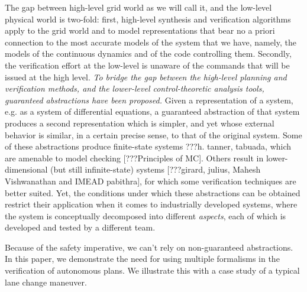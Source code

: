 {The gap between high-level grid world as we will call it, and the low-level physical world is two-fold:
first, high-level synthesis and verification algorithms apply to the grid world  and to model representations that bear no a priori connection to the most accurate models of the system that we have, namely, the models of the continuous dynamics and of the code controlling them.
Secondly, the verification effort at the low-level is unaware of the commands that will be issued at the high level. 
{\it To bridge the gap between the high-level planning and verification methods, and the lower-level control-theoretic analysis tools, guaranteed abstractions have been proposed.}
Given a representation of a system, e.g. as a system of differential equations, a guaranteed abstraction of that system produces a second representation which is simpler, and yet whose external behavior is similar, in a certain precise sense, to that of the original system.
Some of these abstractions produce finite-state systems ???h. tanner, tabuada, which are amenable to model checking [???Principles of MC]. 
Others result in lower-dimensional (but still infinite-state) systems [???girard, julius, Mahesh Vishwanathan and IMEAD pabithra], for which some verification techniques are better suited.
Yet, the conditions under which these abstractions can be obtained restrict their application when it comes to industrially developed systems, where the system is conceptually decomposed into different \emph{aspects}, each of which is developed and tested by a different team.


	
Because of the safety imperative, we can't rely on non-guaranteed abstractions.  
	In this paper, we demonstrate the need for using multiple formalisms in the verification of autonomous plans. 
	We illustrate this with a case study of a typical lane change maneuver.


}

